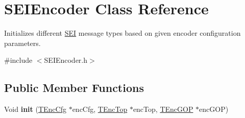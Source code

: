 \hypertarget{class_s_e_i_encoder}{}\section{S\+E\+I\+Encoder Class Reference}
\label{class_s_e_i_encoder}


Initializes different \hyperlink{class_s_e_i}{S\+EI} message types based on given encoder configuration parameters.  




{\ttfamily \#include $<$S\+E\+I\+Encoder.\+h$>$}

\subsection*{Public Member Functions}
\begin{DoxyCompactItemize}
\item 
\mbox{\label{class_s_e_i_encoder_a689f4c49513d0e8e5891374ab7b65c1d}} 
Void {\bfseries init} (\hyperlink{class_t_enc_cfg}{T\+Enc\+Cfg} $\ast$enc\+Cfg, \hyperlink{class_t_enc_top}{T\+Enc\+Top} $\ast$enc\+Top, \hyperlink{class_t_enc_g_o_p}{T\+Enc\+G\+OP} $\ast$enc\+G\+OP)
\end{DoxyCompactItemize}
{\bf }\par
